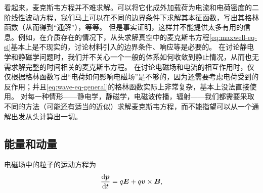 看起来，麦克斯韦方程并不难求解。可以将它化成外加载荷为电流和电荷密度的二阶线性波动方程，我们马上可以在不同的边界条件下求解其本征函数，写出其格林函数（从而得到“通解”），等等。
但是事实证明，这样并不能提供太多有用的信息。例如，在介质存在的情况下，从头求解真空中的麦克斯韦方程\eqref{eq:maxwell-eq-si}基本上是不现实的，讨论材料引入的边界条件、响应等是必要的。
在讨论静电学和静磁学问题时，我们并不关心一个一般的体系如何收敛到静止情况，从而也无需求解完整的时间相关的麦克斯韦方程。
在讨论电磁场和电流的相互作用时，仅仅根据格林函数写出“电荷如何影响电磁场”是不够的，因为还需要考虑电荷受到的反作用；并且\eqref{eq:wave-eq-general}的格林函数实际上非常复杂，基本上没法直接使用。
对每一种情形——静电学，静磁学，电磁波传播，辐射——我们都需要采取不同的方法（可能还有适当的近似）求解麦克斯韦方程，而不能指望可以从一个通解出发从头计算出一切。

\subsection{能量和动量}

电磁场中的粒子的运动方程为
\begin{equation}
    \dv{\vb*{p}}{t} = q \vb*{E} + q \vb*{v} \times \vb*{B},
\end{equation}

